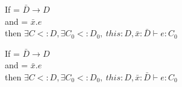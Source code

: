 \begin{theorem}
    If  = $\bar{D} \rightarrow D$ \\
            and  = $\bar{x}.e$\\
            then $\exists C <: D, \exists C_0 <: D_0,~this: D, \bar{x}: \bar{D}\vdash e: C_0$
\end{theorem}



\begin{theorem}
    If  = $\bar{D} \rightarrow D$ \\
            and  = $\bar{x}.e$\\
            then $\exists C <: D, \exists C_0 <: D_0,~this: D, \bar{x}: \bar{D}\vdash e: C_0$
\end{theorem}




